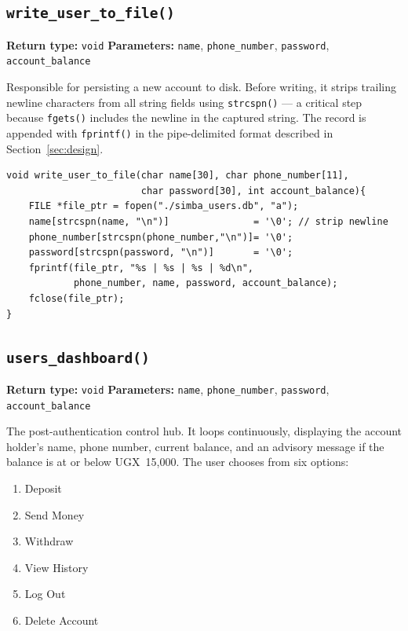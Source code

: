 \documentclass[12pt, a4paper]{article}
\begin{document}
\subsection{\texttt{write\_user\_to\_file()}}

\textbf{Return type:} \texttt{void} \quad
\textbf{Parameters:} \texttt{name}, \texttt{phone\_number}, \texttt{password},
\texttt{account\_balance}

Responsible for persisting a new account to disk. Before writing, it strips trailing newline
characters from all string fields using \texttt{strcspn()} — a critical step because
\texttt{fgets()} includes the newline in the captured string. The record is appended with
\texttt{fprintf()} in the pipe-delimited format described in Section~\ref{sec:design}.

\begin{lstlisting}[caption={Implementation of \texttt{write\_user\_to\_file()}}]
void write_user_to_file(char name[30], char phone_number[11],
                        char password[30], int account_balance){
    FILE *file_ptr = fopen("./simba_users.db", "a");
    name[strcspn(name, "\n")]               = '\0'; // strip newline
    phone_number[strcspn(phone_number,"\n")]= '\0';
    password[strcspn(password, "\n")]       = '\0';
    fprintf(file_ptr, "%s | %s | %s | %d\n",
            phone_number, name, password, account_balance);
    fclose(file_ptr);
}
\end{lstlisting}

\subsection{\texttt{users\_dashboard()}}

\textbf{Return type:} \texttt{void} \quad
\textbf{Parameters:} \texttt{name}, \texttt{phone\_number}, \texttt{password},
\texttt{account\_balance}

The post-authentication control hub. It loops continuously, displaying the account holder's
name, phone number, current balance, and an advisory message if the balance is at or
below UGX~15{,}000. The user chooses from six options:

\begin{enumerate}
    \item Deposit
    \item Send Money
    \item Withdraw
    \item View History
    \item Log Out
    \item Delete Account
\end{enumerate}
\end{document}
